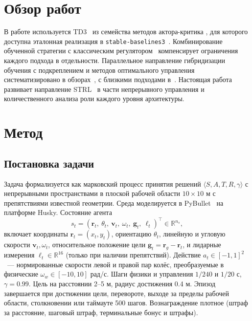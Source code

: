 \documentclass[11pt]{article}
\begin{document}
\section{Обзор работ}
\label{sec:related}

В работе используется TD3~\cite{fujimoto2018td3} из семейства методов актора-критика \mbox{\cite{fujimoto2018td3,lillicrap2016ddpg,haarnoja2018sac,schulman2017ppo}}, для которого доступна эталонная реализация в \verb|stable-baselines3|~\cite{raffin2021sb3}. Комбинирование обученной стратегии с классическим регулятором~\cite{silver2018residual,johannink2019residual} компенсирует ограничения каждого подхода в отдельности. Параллельное направление гибридизации обучения с подкреплением и методов оптимального управления систематизировано в обзорах~\cite{hewing2020lbmpc,brunke2022safe}, с близкими подходами в~\cite{levine2016end,cheng2019control,kahn2018selfsup}. Настоящая работа развивает направление STRL~\cite{gat1998three,kiselev2020dissertation,kiselev2020,veitsenfeld2024} в части непрерывного управления и количественного анализа роли каждого уровня архитектуры.

\section{Метод}
\label{sec:method}

\subsection{Постановка задачи}
\label{sec:problem}

Задача формализуется как марковский процесс принятия решений $\langle S, A, T, R, \gamma \rangle$ с непрерывными пространствами в плоской рабочей области $10 \times 10$ м с препятствиями известной геометрии. Среда моделируется в PyBullet~\cite{coumans2021pybullet} на платформе Husky. Состояние агента
\begin{equation}
s_t = (\mathbf{r}_t,\ \theta_t,\ \mathbf{v}_t,\ \omega_t,\ \mathbf{g}_t,\ \ell_t)^\top \in \mathbb{R}^{n_s},
\end{equation}
включает координаты $\mathbf{r}_t = (x_t, y_t)$, ориентацию $\theta_t$, линейную и угловую скорости $\mathbf{v}_t, \omega_t$, относительное положение цели $\mathbf{g}_t = \mathbf{r}_g - \mathbf{r}_t$, и лидарные измерения $\ell_t \in \mathbb{R}^{16}$ (только при наличии препятствий). Действие $a_t \in [-1, 1]^2$~--- нормированные скорости левой и правой пар колёс, преобразуемые в физические $\omega_w \in [-10, 10]$ рад/с. Шаги физики и управления $1/240$ и $1/20$ с, $\gamma = 0.99$. Цель на расстоянии 2--5 м, радиус достижения 0.4 м. Эпизод завершается при достижении цели, перевороте, выходе за пределы рабочей области, столкновении или таймауте 500 шагов. Вознаграждение плотное (штраф за расстояние, шаговый штраф, терминальные бонус и штрафы).
\end{document}
